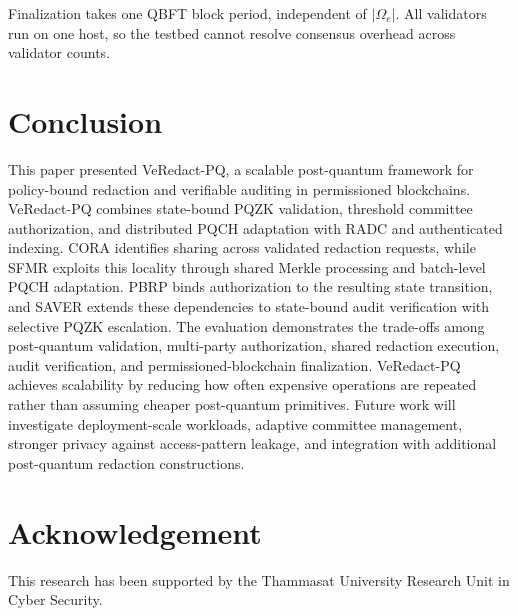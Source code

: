 \documentclass[lettersize,journal]{IEEEtran}
\begin{document}
\textcolor{e5}{Finalization takes one QBFT block period, independent of
$|\Omega_e|$. All validators run on one host, so the testbed cannot
resolve consensus overhead across validator counts.}


\section{Conclusion}
\label{sec:conclusion}

This paper presented VeRedact-PQ, a scalable post-quantum framework
for policy-bound redaction and verifiable auditing in permissioned
blockchains. VeRedact-PQ combines state-bound PQZK validation,
threshold committee authorization, and distributed PQCH adaptation
with RADC and authenticated indexing. CORA identifies sharing across
validated redaction requests, while SFMR exploits this locality through
shared Merkle processing and batch-level PQCH adaptation. PBRP binds
authorization to the resulting state transition, and SAVER extends
these dependencies to state-bound audit verification with selective
PQZK escalation. The evaluation demonstrates the trade-offs among post-quantum
validation, multi-party authorization, shared redaction execution,
audit verification, and permissioned-blockchain finalization.
VeRedact-PQ achieves scalability by reducing how often expensive
operations are repeated rather than assuming cheaper post-quantum
primitives. Future work will investigate deployment-scale workloads,
adaptive committee management, stronger privacy against access-pattern
leakage, and integration with additional post-quantum redaction
constructions.
    
 \section{Acknowledgement}
    This research has been supported by the Thammasat University Research Unit in Cyber Security.
    
\end{document}
